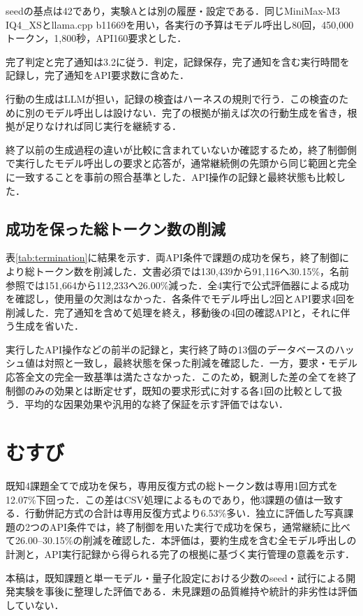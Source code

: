 \documentclass[letter]{ieicej}
\begin{document}
seedの基点は42であり，実験Aとは別の履歴・設定である．同じMiniMax-M3 IQ4\_XSとllama.cpp b11669を用い，各実行の予算はモデル呼出し80回，450,000トークン，1,800秒，API160要求とした．

完了判定と完了通知は3.2に従う．判定，記録保存，完了通知を含む実行時間を記録し，完了通知をAPI要求数に含めた．

行動の生成はLLMが担い，記録の検査はハーネスの規則で行う．この検査のために別のモデル呼出しは設けない．完了の根拠が揃えば次の行動生成を省き，根拠が足りなければ同じ実行を継続する．

終了以前の生成過程の違いが比較に含まれていないか確認するため，終了制御側で実行したモデル呼出しの要求と応答が，通常継続側の先頭から同じ範囲と完全に一致することを事前の照合基準とした．API操作の記録と最終状態も比較した．

\subsection{成功を保った総トークン数の削減}

表\ref{tab:termination}に結果を示す．両API条件で課題の成功を保ち，終了制御により総トークン数を削減した．文書必須では130,439から91,116へ30.15\%，名前参照では151,664から112,233へ26.00\%減った．全4実行で公式評価器による成功を確認し，使用量の欠測はなかった．各条件でモデル呼出し2回とAPI要求4回を削減した．完了通知を含めて処理を終え，移動後の4回の確認APIと，それに伴う生成を省いた．

\TerminationResultsTable

\par\noindent\begin{minipage}{\columnwidth}
実行したAPI操作などの前半の記録と，実行終了時の13個のデータベースのハッシュ値は対照と一致し，最終状態を保った削減を確認した．一方，要求・モデル応答全文の完全一致基準は満たさなかった．このため，観測した差の全てを終了制御のみの効果とは断定せず，既知の要求形式に対する各1回の比較として扱う．平均的な因果効果や汎用的な終了保証を示す評価ではない．
\end{minipage}\par{}

\section{むすび}

既知4課題全てで成功を保ち，専用反復方式の総トークン数は専用1回方式を12.07\%下回った．この差はCSV処理によるものであり，他3課題の値は一致する．行動併記方式の合計は専用反復方式より6.53\%多い．独立に評価した写真課題の2つのAPI条件では，終了制御を用いた実行で成功を保ち，通常継続に比べて26.00--30.15\%の削減を確認した．本評価は，要約生成を含む全モデル呼出しの計測と，API実行記録から得られる完了の根拠に基づく実行管理の意義を示す．

本稿は，既知課題と単一モデル・量子化設定における少数のseed・試行による開発実験を事後に整理した評価である．未見課題の品質維持や統計的非劣性は評価していない．


\end{document}
